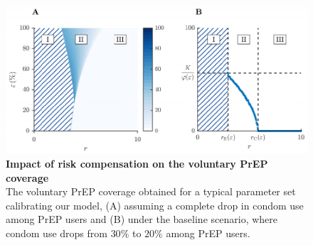 \documentclass[11pt]{article}
\begin{document}
\newpage
\begin{figure}[H]
	\centering	
	\includegraphics{Figures/Fig_S5}
	\caption[Impact of risk compensation on the voluntary PrEP coverage]{%
		{\bf Impact of risk compensation on the voluntary PrEP coverage}\\
	The voluntary PrEP coverage obtained for a typical parameter set calibrating our model, (A) assuming a complete drop in condom use among PrEP users and (B) under the baseline scenario, where condom use drops from $30\%$ to $20\%$ among PrEP users.}
	\label{fig:p_hat_CondomDrop}
\end{figure}


\newpage
\renewcommand{\refname}{\section{References}}
\setlength{\labelsep}{1.5em}

 
\end{document}
